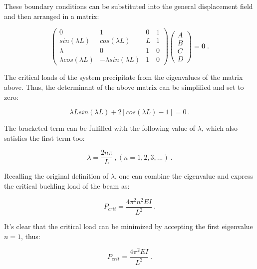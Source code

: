 These boundary conditions can be substituted into the general displacement field and then arranged in a matrix:

\begin{equation} 
\begin{pmatrix}
0 & 1 & 0 & 1 \\
sin(\lambda L) & cos(\lambda L) & L & 1\\
\lambda & 0 & 1 & 0 \\
\lambda cos(\lambda L) & -\lambda sin(\lambda L) & 1 & 0
\end{pmatrix}
\begin{pmatrix}
A \\
B \\
C \\
D
\end{pmatrix}
=
\mathbf{0}
\label{eqapp4_6}\ .
\end{equation}

The critical loads of the system precipitate from the eigenvalues of the matrix above. Thus, the determinant of the above matrix can be simplified and set to zero:

\begin{equation} 
\lambda L sin(\lambda L) + 2[cos(\lambda L) - 1] = 0
\label{eqapp4_7}\ .
\end{equation}

The bracketed term can be fulfilled with the following value of $\lambda$, which also satisfies the first term too:

\begin{equation} 
\lambda = \frac{2n\pi}{L}\ ,
(n = 1, 2, 3, ...)
\label{eqapp4_8}\ .
\end{equation}

Recalling the original definition of $\lambda$, one can combine the eigenvalue and express the critical buckling load of the beam as:

\begin{equation} 
P_{crit} = \frac{4\pi^2 n^2 EI}{L^2}
\label{eqapp4_9}\ .
\end{equation}

It's clear that the critical load can be minimized by accepting the first eigenvalue $n=1$, thus:

\begin{equation} 
P_{crit} = \frac{4\pi^2 EI}{L^2}
\label{eqapp4_10}\ .
\end{equation}
